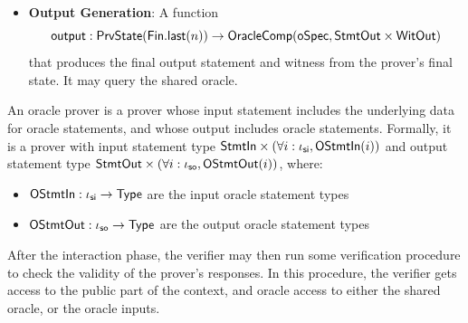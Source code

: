 \begin{definition}
\begin{itemize}
        \item \textbf{Output Generation}: A function
        \begin{equation*} \mathsf{output} : \mathsf{PrvState}(\mathsf{Fin}.\mathsf{last}(n)) \to \mathsf{OracleComp}(\mathsf{oSpec}, \mathsf{StmtOut} \times \mathsf{WitOut}) \end{equation*}
        that produces the final output statement and witness from the prover's final state. It
        may query the shared oracle.
    \end{itemize}
    \leanok
\end{definition}

\begin{definition}
    \label{def:oracle_prover}
    An oracle prover is a prover whose input statement includes the underlying data for oracle statements, and whose output includes oracle statements. Formally, it is a prover with input statement type \(\mathsf{StmtIn} \times (\forall i : \iota_{\mathsf{si}}, \mathsf{OStmtIn}(i))\) and output statement type \(\mathsf{StmtOut} \times (\forall i : \iota_{\mathsf{so}}, \mathsf{OStmtOut}(i))\), where:
    \begin{itemize}
        \item \(\mathsf{OStmtIn} : \iota_{\mathsf{si}} \to \mathsf{Type}\) are the input oracle statement types
        \item \(\mathsf{OStmtOut} : \iota_{\mathsf{so}} \to \mathsf{Type}\) are the output oracle statement types
    \end{itemize}
    \leanok
\end{definition}


After the interaction phase, the verifier may then run some verification procedure to check the
validity of the prover's responses. In this procedure, the verifier gets access to the public part
of the context, and oracle access to either the shared oracle, or the oracle inputs.

